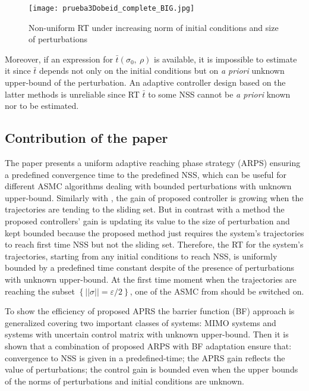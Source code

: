 \documentclass[twocolumn]{autart}    %
\begin{document}
\begin{figure}[h!]
		\centering
		\texttt{[image: prueba3Dobeid\_complete\_BIG.jpg]}%
		\caption{Non-uniform RT under increasing norm of initial conditions and size of perturbations}%
		\label{fig:obeid_BFBSMC}
	\end{figure}\vspace{-10pt}
	
Moreover, if an expression for $\bar{t}(\sigma_0,\:\rho)$ is available, it is impossible to estimate it since $\bar{t}$ depends not only on the initial conditions but on  \textit{a priori }unknown upper-bound of the perturbation. An adaptive controller design based on the latter methods is unreliable since RT $\bar{t}$ to some NSS cannot be \textit{a priori} known nor to be estimated. 
\subsection{Contribution of the paper}
The paper presents a uniform adaptive reaching phase strategy (ARPS) ensuring a predefined convergence time to the predefined NSS, which can be useful for different ASMC algorithms \cite{negrete2016,obeid18,plestan2010} dealing with bounded perturbations with unknown upper-bound.  Similarly with \cite{chitour2020,ferrara2020,gomez2020,holloway2019,jimenez2020,song2017}, the gain of proposed controller is growing when the trajectories are tending to the sliding set.  But in contrast with a method \cite{chitour2020,ferrara2020,holloway2019,jimenez2020,song2017} the proposed controllers' gain is updating its value to the size of perturbation and kept bounded because the proposed method just requires the system's trajectories to reach first time NSS but not the sliding set. Therefore, the RT for the system's trajectories, starting from any initial conditions to reach NSS, is uniformly bounded by a predefined time constant despite of the presence of perturbations with unknown upper-bound.  At the first time moment when the trajectories are reaching the subset $\left\lbrace ||\sigma||=\varepsilon/2 \right\rbrace$, one of the ASMC from \cite{negrete2016,obeid18,plestan2010} should be switched on.

To show the efficiency of proposed APRS the barrier function (BF) approach is generalized covering two important classes of systems: MIMO systems and systems with uncertain control matrix with unknown upper-bound. Then it is shown that a combination of proposed ARPS with BF adaptation ensure that: convergence to NSS is given in a predefined-time; the APRS gain reflects the value of perturbations; the control gain is bounded even when the upper bounds of the norms of perturbations and initial conditions are unknown.
\end{document}
